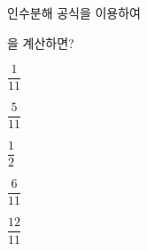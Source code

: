 인수분해 공식을 이용하여\par{}\noindent 을 계산하면?
\begin{choices32}{\rule[-3ex]{0pt}{8ex}$\dfrac{1}{11}$}{\rule[-3ex]{0pt}{8ex}$\dfrac{5}{11}$}{\rule[-3ex]{0pt}{8ex}$\dfrac{1}{2}$}{\rule[-3ex]{0pt}{8ex}$\dfrac{6}{11}$}{\rule[-3ex]{0pt}{8ex}$\dfrac{12}{11}$}\end{choices32}

